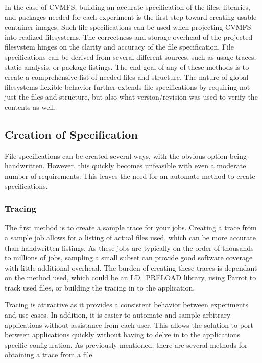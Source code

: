 \documentclass[sigconf]{acmart}
\begin{document}
In the case of CVMFS,
building an accurate 
specification of the files, libraries, and packages
needed for each experiment is the first step toward creating usable container images.
Such file specifications can be used when 
projecting CVMFS into realized filesystems.
The correctness and storage overhead of the projected filesystem hinges on the clarity and accuracy of the file specification.
File specifications can be derived from several
different sources, such as 
usage traces, static analysis, or package listings.
The end goal of any of these methods is to 
create a comprehensive list of needed files and structure.
The nature of global filesystems flexible behavior
further extends file specifications by requiring
not just the files and structure, but also what
version/revision was used to verify the contents as well.

\subsection{Creation of Specification}
File specifications can be created several ways,
with the obvious option being handwritten.
However, this quickly becomes unfeasible with
even a moderate number of requirements.
This leaves the need for an automate method to create
specifications.

\subsubsection{Tracing}
The first method is to create a sample trace for your
jobs. 
Creating a trace from a sample job allows 
for a listing of actual files used, which
can be more accurate than handwritten listings.
As these jobs are typically on the order of thousands
to millions of jobs, sampling a small subset
can provide good software coverage with little
additional overhead. %
The burden of creating these traces is
dependant on the method used,
which could be an LD\_PRELOAD library,
using Parrot to track used files, %
or building the tracing in to the application.

Tracing is attractive as it provides a consistent 
behavior between experiments and use cases.
In addition, it is easier to automate and sample arbitrary applications without assistance from each user.
This allows the solution to port between applications
quickly without having to delve in to the applications
specific configuration.
As previously mentioned, there are several methods for
obtaining a trace from a file.
\end{document}
